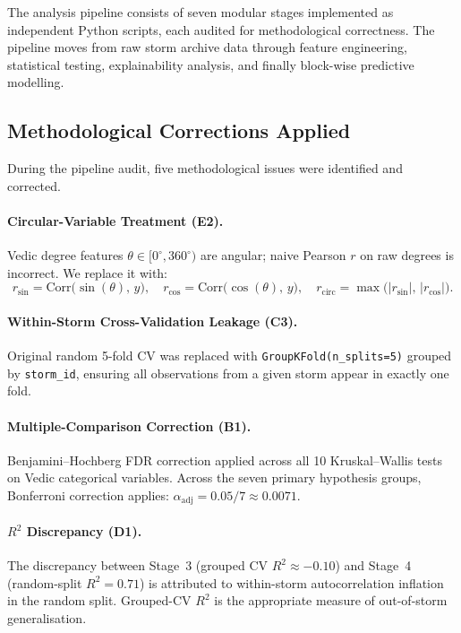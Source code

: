 \documentclass[12pt,a4paper]{article}
\begin{document}
    The analysis pipeline consists of seven modular stages implemented as
    independent Python scripts, each audited for methodological correctness.
    The pipeline moves from raw storm archive data through feature engineering,
    statistical testing, explainability analysis, and finally block-wise predictive
    modelling.

    \subsection{Methodological Corrections Applied}

    During the pipeline audit, five methodological issues were identified and
    corrected.

    \paragraph{Circular-Variable Treatment (E2).} Vedic degree features
    $\theta \in [0^\circ, 360^\circ)$ are angular; naive Pearson $r$ on raw
    degrees is incorrect. We replace it with:
    \begin{equation}
    r_{\sin} = \mathrm{Corr}\bigl(\sin(\theta),\, y\bigr), \quad
    r_{\cos} = \mathrm{Corr}\bigl(\cos(\theta),\, y\bigr), \quad
    r_{\text{circ}} = \max\!\bigl(|r_{\sin}|,\, |r_{\cos}|\bigr).
    \end{equation}

    \paragraph{Within-Storm Cross-Validation Leakage (C3).} Original random
    5-fold CV was replaced with \texttt{GroupKFold(n\_splits=5)} grouped by
    \texttt{storm\_id}, ensuring all observations from a given storm appear in
    exactly one fold.

    \paragraph{Multiple-Comparison Correction (B1).} Benjamini--Hochberg FDR
    correction applied across all 10 Kruskal--Wallis tests on Vedic categorical
    variables. Across the seven primary hypothesis groups, Bonferroni correction
    applies: $\alpha_{\text{adj}} = 0.05/7 \approx 0.0071$.

    \paragraph{$R^2$ Discrepancy (D1).} The discrepancy between Stage~3 (grouped
    CV $R^2 \approx -0.10$) and Stage~4 (random-split $R^2 = 0.71$) is attributed
    to within-storm autocorrelation inflation in the random split. Grouped-CV
    $R^2$ is the appropriate measure of out-of-storm generalisation.
\end{document}
